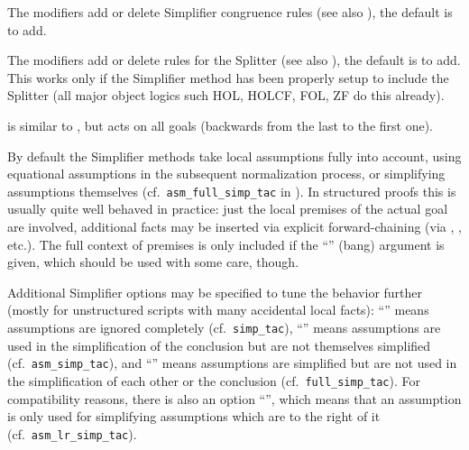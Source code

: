 \begin{isabellebody}
\begin{isamarkuptext}
\begin{descr}
  \medskip The  modifiers add or delete Simplifier
  congruence rules (see also \cite{isabelle-ref}), the default is to
  add.

  \medskip The  modifiers add or delete rules for the
  Splitter (see also \cite{isabelle-ref}), the default is to add.
  This works only if the Simplifier method has been properly setup to
  include the Splitter (all major object logics such HOL, HOLCF, FOL,
  ZF do this already).

  \item [\mbox{\isa{simp{\isacharunderscore}all}}] is similar to \mbox{}, but acts on
  all goals (backwards from the last to the first one).

  \end{descr}

  By default the Simplifier methods take local assumptions fully into
  account, using equational assumptions in the subsequent
  normalization process, or simplifying assumptions themselves (cf.\
  \verb|asm_full_simp_tac| in \cite[\S10]{isabelle-ref}).  In
  structured proofs this is usually quite well behaved in practice:
  just the local premises of the actual goal are involved, additional
  facts may be inserted via explicit forward-chaining (via \mbox{}, \mbox{}, \mbox{} etc.).  The full
  context of premises is only included if the ``\isa{{\isachardoublequote}{\isacharbang}{\isachardoublequote}}'' (bang)
  argument is given, which should be used with some care, though.

  Additional Simplifier options may be specified to tune the behavior
  further (mostly for unstructured scripts with many accidental local
  facts): ``'' means assumptions are ignored
  completely (cf.\ \verb|simp_tac|), ``'' means
  assumptions are used in the simplification of the conclusion but are
  not themselves simplified (cf.\ \verb|asm_simp_tac|), and ``'' means assumptions are simplified but are not used
  in the simplification of each other or the conclusion (cf.\ \verb|full_simp_tac|).  For compatibility reasons, there is also an option
  ``\isa{{\isachardoublequote}{\isacharparenleft}asm{\isacharunderscore}lr{\isacharparenright}{\isachardoublequote}}'', which means that an assumption is only used
  for simplifying assumptions which are to the right of it (cf.\ \verb|asm_lr_simp_tac|).


\end{isamarkuptext}
\end{isabellebody}

